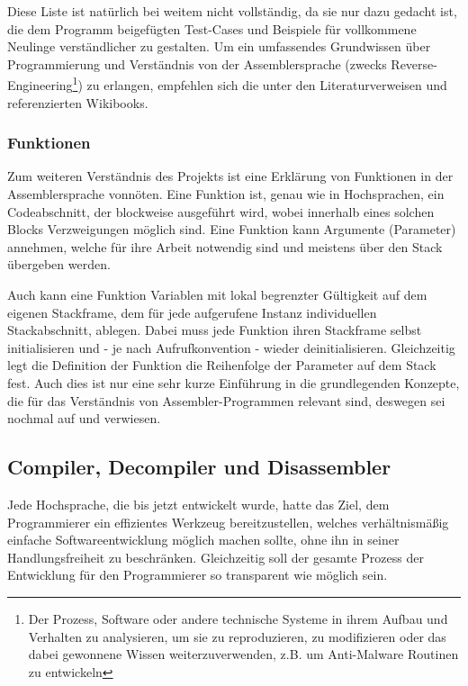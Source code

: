 \documentclass[11pt]{article}
\begin{document}
Diese Liste ist natürlich bei weitem nicht vollständig, da sie nur dazu gedacht ist, die dem
Programm beigefügten Test-Cases und Beispiele für vollkommene Neulinge verständlicher zu gestalten.
Um ein umfassendes Grundwissen über Programmierung und Verständnis von der Assemblersprache (zwecks
Reverse-Engineering\footnote{Der Prozess, Software oder andere technische Systeme in ihrem
Aufbau und Verhalten zu analysieren, um sie zu reproduzieren, zu modifizieren oder das dabei
gewonnene Wissen weiterzuverwenden, z.B. um Anti-Malware Routinen zu entwickeln}) zu erlangen,
empfehlen sich die unter den Literaturverweisen \cite{wikibook1:7} und \cite{wikibook2:8}
referenzierten Wikibooks.
\subsubsection{Funktionen}
Zum weiteren Verständnis des Projekts ist eine Erklärung von Funktionen in der Assemblersprache vonnöten.
Eine Funktion ist, genau wie in Hochsprachen, ein Codeabschnitt, der blockweise ausgeführt wird,
wobei innerhalb eines solchen Blocks Verzweigungen möglich sind. Eine Funktion kann Argumente
(Parameter) annehmen, welche für ihre Arbeit notwendig sind und meistens über den Stack
übergeben werden.

Auch kann eine Funktion Variablen mit lokal begrenzter Gültigkeit auf dem eigenen
Stackframe, dem für jede aufgerufene Instanz individuellen Stackabschnitt, ablegen.
Dabei muss jede Funktion ihren Stackframe selbst initialisieren und - je nach Aufrufkonvention -
wieder deinitialisieren. Gleichzeitig legt die Definition der Funktion die Reihenfolge der Parameter
auf dem Stack fest. Auch dies ist nur eine sehr kurze Einführung in die grundlegenden Konzepte, die
für das Verständnis von Assembler-Programmen relevant sind, deswegen sei nochmal auf
\cite{wikibook1:7} und \cite{wikibook2:8} verwiesen.

\subsection{Compiler, Decompiler und Disassembler}
Jede Hochsprache, die bis jetzt entwickelt wurde, hatte das Ziel, dem Programmierer ein effizientes
Werkzeug bereitzustellen, welches verhältnismäßig einfache Softwareentwicklung möglich machen
sollte, ohne ihn in seiner Handlungsfreiheit zu beschränken. Gleichzeitig soll der gesamte Prozess
der Entwicklung für den Programmierer so transparent wie möglich sein.
\end{document}
